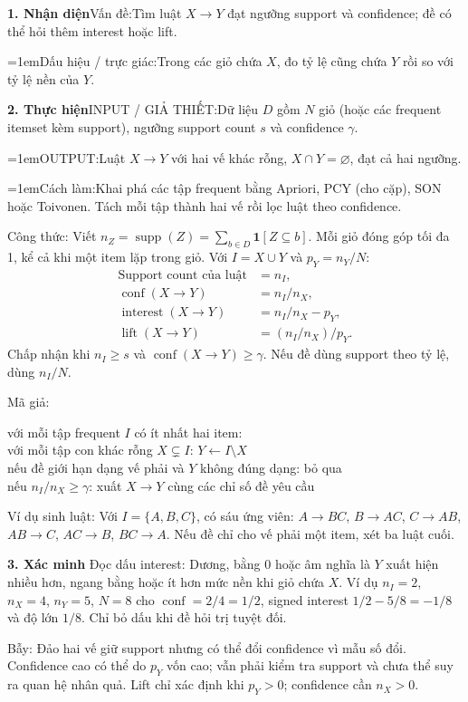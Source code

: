 \documentclass[10pt,a4paper,twocolumn]{article}
\makeatletter
\newcommand{\key}[1]{#1:\enspace}
\newcommand{\algfield}[2]{\par\noindent\hangindent=1em\relax#1:\enspace#2}
\newcommand{\unitheading}[2]{%
  \par\addvspace{1pt}\noindent\textbf{#1. #2}\enspace}
\newcommand{\unitverification}{\unitheading{3}{Xác minh}}
\newcommand{\unitfield}[4]{%
  \par\noindent\textbf{#1. #2}\enspace #3:\enspace #4}
\newcommand{\algsummary}[6]{%
  \begingroup\setlength{\parskip}{1pt}%
  \unitfield{1}{Nhận diện}{Vấn đề}{#1}%
  \algfield{Dấu hiệu / trực giác}{#2}%
  \if\relax\detokenize{#3}\relax\else\par\noindent#3\par\fi%
  \unitfield{2}{Thực hiện}{INPUT / GIẢ THIẾT}{#4}%
  \algfield{OUTPUT}{#5}%
  \algfield{Cách làm}{#6}\par\endgroup}
\newenvironment{algpseudo}{%
  \par\addvspace{2pt}\noindent
  \setlength{\parskip}{0pt}%
  Mã giả:\par\nobreak
  \begin{list}{}{\setlength{\leftmargin}{1em}\setlength{\topsep}{0pt}%
    \setlength{\partopsep}{0pt}\setlength{\parsep}{0pt}%
    \@beginparpenalty=10000\relax}%
  \item\relax
}{\end{list}\par\addvspace{3pt}}
\makeatother
\begin{document}
\algsummary{Tìm luật $X\to Y$ đạt ngưỡng support và confidence; đề có thể hỏi thêm interest hoặc lift.}{Trong các giỏ chứa $X$, đo tỷ lệ cũng chứa $Y$ rồi so với tỷ lệ nền của $Y$.}{}{Dữ liệu $D$ gồm $N$ giỏ (hoặc các frequent itemset kèm support), ngưỡng support count $s$ và confidence $\gamma$.}{Luật $X\to Y$ với hai vế khác rỗng, $X\cap Y=\varnothing$, đạt cả hai ngưỡng.}{Khai phá các tập frequent bằng Apriori, PCY (cho cặp), SON hoặc Toivonen. Tách mỗi tập thành hai vế rồi lọc luật theo confidence.}

\key{Công thức} Viết $n_Z=\operatorname{supp}(Z)=\sum_{b\in D}\mathbf1[Z\subseteq b]$. Mỗi giỏ đóng góp tối đa 1, kể cả khi một item lặp trong giỏ. Với $I=X\cup Y$ và $p_Y=n_Y/N$:
\[
\begin{aligned}
\text{Support count của luật}&=n_I,\\
\operatorname{conf}(X\to Y)&=n_I/n_X,\\
\operatorname{interest}(X\to Y)&=n_I/n_X-p_Y,\\
\operatorname{lift}(X\to Y)&=(n_I/n_X)/p_Y.
\end{aligned}
\]
Chấp nhận khi $n_I\ge s$ và $\operatorname{conf}(X\to Y)\ge\gamma$. Nếu đề dùng support theo tỷ lệ, dùng $n_I/N$.

\begin{algpseudo}
với mỗi tập frequent $I$ có ít nhất hai item:\\
\quad với mỗi tập con khác rỗng $X\subsetneq I$: $Y\gets I\setminus X$\\
\qquad nếu đề giới hạn dạng vế phải và $Y$ không đúng dạng: bỏ qua\\
\qquad nếu $n_I/n_X\ge\gamma$: xuất $X\to Y$ cùng các chỉ số đề yêu cầu
\end{algpseudo}

\key{Ví dụ sinh luật} Với $I=\{A,B,C\}$, có sáu ứng viên: $A\to BC$, $B\to AC$, $C\to AB$, $AB\to C$, $AC\to B$, $BC\to A$. Nếu đề chỉ cho vế phải một item, xét ba luật cuối.

\unitverification
\key{Đọc dấu interest} Dương, bằng 0 hoặc âm nghĩa là $Y$ xuất hiện nhiều hơn, ngang bằng hoặc ít hơn mức nền khi giỏ chứa $X$. Ví dụ $n_I=2$, $n_X=4$, $n_Y=5$, $N=8$ cho $\operatorname{conf}=2/4=1/2$, signed interest $1/2-5/8=-1/8$ và độ lớn $1/8$. Chỉ bỏ dấu khi đề hỏi trị tuyệt đối.

\key{Bẫy} Đảo hai vế giữ support nhưng có thể đổi confidence vì mẫu số đổi. Confidence cao có thể do $p_Y$ vốn cao; vẫn phải kiểm tra support và chưa thể suy ra quan hệ nhân quả. Lift chỉ xác định khi $p_Y>0$; confidence cần $n_X>0$.
\end{document}
